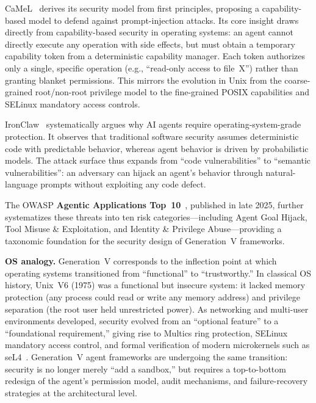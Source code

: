 \documentclass[11pt,a4paper]{article}
\begin{document}
CaMeL~\cite{debenedetti2025camel} derives its security model from first principles, proposing a capability-based model to defend against prompt-injection attacks.
Its core insight draws directly from capability-based security in operating systems: an agent cannot directly execute any operation with side effects, but must obtain a temporary capability token from a deterministic capability manager.
Each token authorizes only a single, specific operation (e.g., ``read-only access to file~X'') rather than granting blanket permissions.
This mirrors the evolution in Unix from the coarse-grained root/non-root privilege model to the fine-grained POSIX capabilities and SELinux mandatory access controls.

IronClaw~\cite{ironclaw2025} systematically argues why AI agents require operating-system-grade protection.
It observes that traditional software security assumes deterministic code with predictable behavior, whereas agent behavior is driven by probabilistic models.
The attack surface thus expands from ``code vulnerabilities'' to ``semantic vulnerabilities'': an adversary can hijack an agent's behavior through natural-language prompts without exploiting any code defect.

The OWASP \textbf{Agentic Applications Top~10}~\cite{owasp_agentic2026}, published in late 2025, further systematizes these threats into ten risk categories---including Agent Goal Hijack, Tool Misuse \& Exploitation, and Identity \& Privilege Abuse---providing a taxonomic foundation for the security design of Generation~V frameworks.

\textbf{OS analogy.}
Generation~V corresponds to the inflection point at which operating systems transitioned from ``functional'' to ``trustworthy.''
In classical OS history, Unix~V6 (1975) was a functional but insecure system: it lacked memory protection (any process could read or write any memory address) and privilege separation (the root user held unrestricted power).
As networking and multi-user environments developed, security evolved from an ``optional feature'' to a ``foundational requirement,'' giving rise to Multics ring protection, SELinux mandatory access control, and formal verification of modern microkernels such as seL4~\cite{ostep_2023}.
Generation~V agent frameworks are undergoing the same transition: security is no longer merely ``add a sandbox,'' but requires a top-to-bottom redesign of the agent's permission model, audit mechanisms, and failure-recovery strategies at the architectural level.
\end{document}
